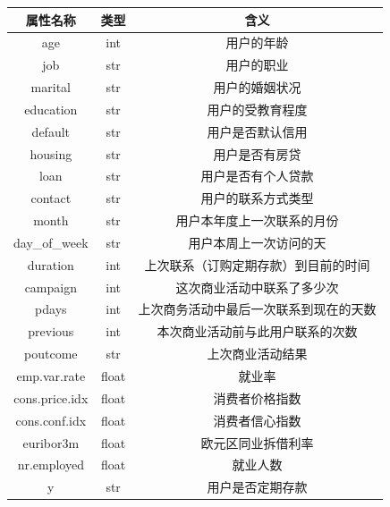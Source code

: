 \documentclass{ctexart}
\begin{document}
    \begin{center}
        \begin{tabular}{|c|c|c|}
            \hline
            属性名称 & 类型 & 含义 \\
            \hline
            age & int & 用户的年龄 \\
            \hline
            job & str & 用户的职业 \\
            \hline
            marital & str & 用户的婚姻状况 \\
            \hline
            education & str & 用户的受教育程度 \\
            \hline
            default & str & 用户是否默认信用 \\
            \hline
            housing & str & 用户是否有房贷 \\
            \hline
            loan & str & 用户是否有个人贷款 \\
            \hline
            contact & str & 用户的联系方式类型 \\
            \hline
            month & str & 用户本年度上一次联系的月份 \\
            \hline
            day\_of\_week & str & 用户本周上一次访问的天 \\
            \hline
            duration & int & 上次联系（订购定期存款）到目前的时间 \\
            \hline
            campaign & int & 这次商业活动中联系了多少次 \\
            \hline
            pdays & int & 上次商务活动中最后一次联系到现在的天数 \\
            \hline
            previous & int & 本次商业活动前与此用户联系的次数 \\
            \hline
            poutcome & str & 上次商业活动结果 \\
            \hline
            emp.var.rate & float & 就业率 \\
            \hline
            cons.price.idx & float & 消费者价格指数 \\
            \hline
            cons.conf.idx & float & 消费者信心指数 \\
            \hline
            euribor3m & float & 欧元区同业拆借利率 \\
            \hline
            nr.employed & float & 就业人数 \\
            \hline
            y & str & 用户是否定期存款 \\
            \hline
        \end{tabular}
    \end{center}
    
\end{document}
